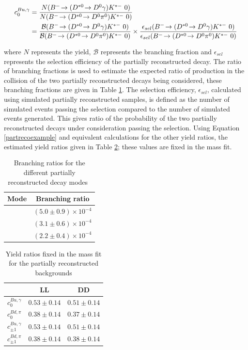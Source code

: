 \begin{align}
c^{Bu,\gamma}_0 &= \frac{N(\decay{\Bm}{(\decay{\Dstarz}{\Dz\gamma})\Kstarm}\ 0)}{N(\decay{\Bm}{(\decay{\Dstarz}{\Dz\piz})\Kstarm}\ 0)} \nonumber \\ 
&= \frac{\mathcal{B}(\decay{\Bm}{(\decay{\Dstarz}{\Dz\gamma})\Kstarm}\ 0)}{\mathcal{B}(\decay{\Bm}{(\decay{\Dstarz}{\Dz\piz})\Kstarm}\ 0)} \times \frac{\epsilon_{sel}(\decay{\Bm}{(\decay{\Dstarz}{\Dz\gamma})\Kstarm}\ 0)}{\epsilon_{sel}(\decay{\Bm}{(\decay{\Dstarz}{\Dz\piz})\Kstarm}\ 0)}
\label{partrecoexample}
\end{align}

where $N$ represents the yield, $\mathcal{B}$ represents the branching fraction and $\epsilon_{sel}$ represents the selection efficiency of the partially reconstructed decay. The ratio of branching fractions is used to estimate the expected ratio of production in the collision of the two partially reconstructed decays being considered, these branching fractions are given in Table \ref{partrecoBRs}. The selection efficiency, $\epsilon_{sel}$, calculated using simulated partially reconstructed samples, is defined as the number of simulated events passing the selection compared to the number of simulated events generated. This gives ratio of the probability of the two partially reconstructed decays under consideration passing the selection. Using Equation \ref{partrecoexample} and equivalent calculations for the other yield ratios, the estimated yield ratios given in Table \ref{fixedyieldratios}; these values are fixed in the mass fit. 

\begin{table}[h]
\centering
\begin{tabular}{c|c}
Mode & Branching ratio \\
\hline
\decay{\Bm}{(\decay{\Dstarz}{\Dz\piz})\Kstarm} & $(5.0 \pm 0.9) \times 10^{-4}$ \\
\decay{\Bm}{(\decay{\Dstarz}{\Dz\gamma})\Kstarm} & $(3.1 \pm 0.6) \times 10^{-4}$ \\
\decay{\Bd}{(\decay{\Dstarp}{\Dz\pip})\Kstarm} & $(2.2 \pm 0.4) \times 10^{-4}$ \\
\end{tabular}
\caption{Branching ratios for the different partially reconstructed decay modes~\cite{PDG2014}}
\label{partrecoBRs}
\end{table}

\begin{table}[h]
\centering
\begin{tabular}{ccc}
\hline
& LL & DD \\
\hline
$c^{Bu,\gamma}_0$ & $0.53 \pm 0.14$ & $0.51 \pm 0.14$ \\[3mm]
$c^{Bd,\pi}_0$ & $0.38 \pm 0.14$ & $0.37 \pm 0.14$ \\[3mm]
$c^{Bu,\gamma}_{\pm 1}$ & $0.53 \pm 0.14$ & $0.51 \pm 0.14$ \\[3mm]
$c^{Bd,\pi}_{\pm 1}$ & $0.38 \pm 0.14$ & $0.38 \pm 0.14$ \\[3mm]
\hline
\end{tabular}
\caption{Yield ratios fixed in the mass fit for the partially reconstructed backgrounds}
\label{fixedyieldratios}
\end{table}

